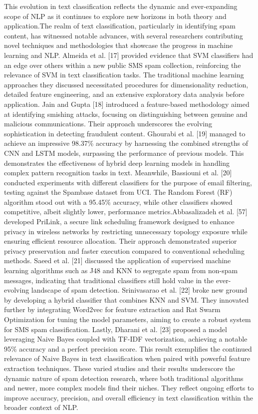 This evolution in text classification reflects the dynamic and ever-expanding scope of NLP as it continues to explore new horizons in both theory and application.The realm of text classification, particularly in identifying spam content, has witnessed notable advances, with several researchers contributing novel techniques and methodologies that showcase the progress in machine learning and NLP. Almeida et al. [17] provided evidence that SVM classifiers had an edge over others within a new public SMS spam collection, reinforcing the relevance of SVM in text classification tasks. The traditional machine learning approaches they discussed necessitated procedures for dimensionality reduction, detailed feature engineering, and an extensive exploratory data analysis before application. Jain and Gupta [18] introduced a feature-based methodology aimed at identifying smishing attacks, focusing on distinguishing between genuine and malicious communications. Their approach underscores the evolving sophistication in detecting fraudulent content.
Ghourabi et al. [19] managed to achieve an impressive 98.37\% accuracy by harnessing the combined strengths of CNN and LSTM models, surpassing the performance of previous models. This demonstrates the effectiveness of hybrid deep learning models in handling complex pattern recognition tasks in text. Meanwhile, Bassiouni et al. [20] conducted experiments with different classifiers for the purpose of email filtering, testing against the Spambase dataset from UCI. The Random Forest (RF) algorithm stood out with a 95.45\% accuracy, while other classifiers showed competitive, albeit slightly lower, performance metrics.Abbasalizadeh et al. [57] developed PriLink, a secure link scheduling framework designed to enhance privacy in wireless networks by restricting unnecessary topology exposure while ensuring efficient resource allocation. Their approach demonstrated superior privacy preservation and faster execution compared to conventional scheduling methods. 
Saeed et al. [21] discussed the application of supervised machine learning algorithms such as J48 and KNN to segregate spam from non-spam messages, indicating that traditional classifiers still hold value in the ever-evolving landscape of spam detection. Srinivasarao et al. [22] broke new ground by developing a hybrid classifier that combines KNN and SVM. They innovated further by integrating Word2vec for feature extraction and Rat Swarm Optimization for tuning the model parameters, aiming to create a robust system for SMS spam classification. Lastly, Dharani et al. [23] proposed a model leveraging Naive Bayes coupled with TF-IDF vectorization, achieving a notable 95\% accuracy and a perfect precision score. This result exemplifies the continued relevance of Naive Bayes in text classification when paired with powerful feature extraction techniques. These varied studies and their results underscore the dynamic nature of spam detection research, where both traditional algorithms and newer, more complex models find their niches. They reflect ongoing efforts to improve accuracy, precision, and overall efficiency in text classification within the broader context of NLP.
